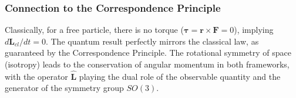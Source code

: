\subsubsection{Connection to the Correspondence Principle}
Classically, for a free particle, there is no torque ($\boldsymbol{\tau} = \mathbf{r} \times \mathbf{F} = 0$), implying $d\mathbf{L}_{cl}/dt = 0$.
The quantum result perfectly mirrors the classical law, as guaranteed by the Correspondence Principle. The rotational symmetry of space (isotropy) leads to the conservation of angular momentum in both frameworks, with the operator $\hat{\mathbf{L}}$ playing the dual role of the observable quantity and the generator of the symmetry group $SO(3)$.